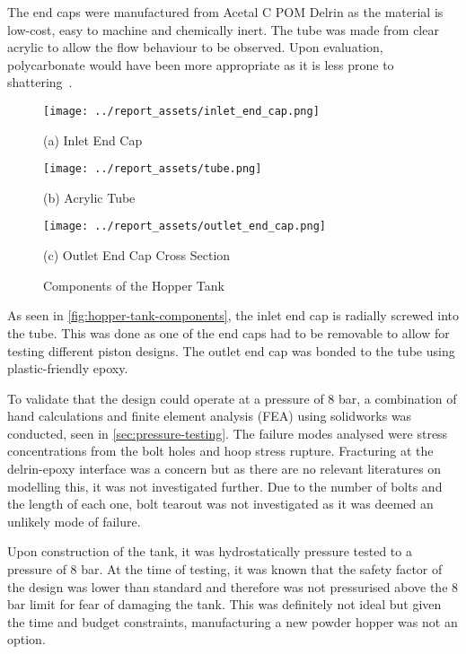 The end caps were manufactured from Acetal C POM Delrin as the material is low-cost, easy to machine and chemically inert. The tube was made from clear acrylic to allow the flow behaviour to be observed. Upon evaluation, polycarbonate would have been more appropriate as it is less prone to shattering~\cite{SADEGHIESFAHLANI2021e06856}.
\begin{figure}[htbp]
    \centering

    \begin{minipage}{0.3\textwidth}
        \centering
        \texttt{[image: ../report\_assets/inlet\_end\_cap.png]}
        \caption*{(a) Inlet End Cap}
    \end{minipage}
    \hfill
    \begin{minipage}{0.3\textwidth}
        \centering
        \texttt{[image: ../report\_assets/tube.png]}
        \caption*{(b) Acrylic Tube}
    \end{minipage}
    \hfill
    \begin{minipage}{0.3\textwidth}
        \centering
        \texttt{[image: ../report\_assets/outlet\_end\_cap.png]}
        \caption*{(c) Outlet End Cap Cross Section}
    \end{minipage}
    \caption{Components of the Hopper Tank}\label{fig:hopper-tank-components}
\end{figure}
As seen in \autoref{fig:hopper-tank-components}, the inlet end cap is radially screwed into the tube. This was done as one of the end caps had to be removable to allow for testing different piston designs. The outlet end cap was bonded to the tube using plastic-friendly epoxy.

To validate that the design could operate at a pressure of 8 bar, a combination of hand calculations and finite element analysis (FEA) using solidworks was conducted, seen in \autoref{sec:pressure-testing}. The failure modes analysed were stress concentrations from the bolt holes and hoop stress rupture. Fracturing at the delrin-epoxy interface was a concern but as there are no relevant literatures on modelling this, it was not investigated further. Due to the number of bolts and the length of each one, bolt tearout was not investigated as it was deemed an unlikely mode of failure.

Upon construction of the tank, it was hydrostatically pressure tested to a pressure of 8 bar. At the time of testing, it was known that the safety factor of the design was lower than standard and therefore was not pressurised above the 8 bar limit for fear of damaging the tank. This was definitely not ideal but given the time and budget constraints, manufacturing a new powder hopper was not an option.

